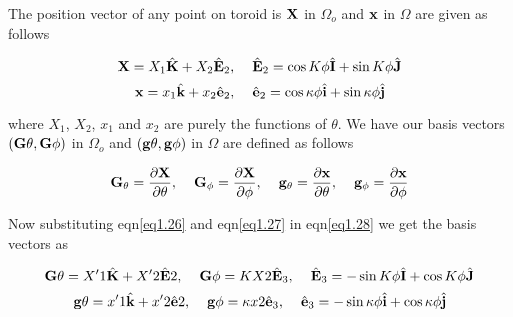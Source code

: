 \documentclass[12pt]{report}
\begin{document}
\begin{flushleft}

The position vector of any point on toroid is ${\bf{X}}$ in $\Omega_{o}$ and ${\bf{x}}$ in $\Omega$ are given as follows

\begin{equation}\label{eq1.26}
    {\bf{X}} = X_{1}\hat{\bf{K}} + X_{2}\hat{\bf{E}}_{2},\hspace{4mm}
    \hat{\bf{E}}_{2} = \cos K\phi\hat{\bf{I}} +\sin K\phi\hat{\bf{J}}
\end{equation}
\vspace{-4mm}
\begin{equation}\label{eq1.27}
    {\bf{x}} = x_{1}\hat{\bf{k}} + x_{2}\hat{\bf{e}}_{2},\hspace{4mm}
    \hat{\bf{e}}_{2} = \cos \kappa\phi\hat{\bf{i}} +\sin \kappa\phi\hat{\bf{j}}
\end{equation}

where $X_{1}$, $X_{2}$, $x_{1}$ and $x_{2}$ are purely the functions of $\theta$. We have our basis vectors $({\bf{G}}{\theta},{\bf{G}}{\phi})$ in $\Omega_{o}$ and $({\bf{g}}{\theta},{\bf{g}}{\phi})$ in $\Omega$ are defined as follows

\begin{equation}\label{eq1.28}
    {\bf{G}}_{\theta} = \frac{\partial {\bf{X}} }{\partial\theta},\hspace{4mm}
    {\bf{G}}_{\phi} = \frac{\partial {\bf{X}} }{\partial\phi},\hspace{4mm}
    {\bf{g}}_{\theta} = \frac{\partial {\bf{x}} }{\partial\theta},\hspace{4mm}
    {\bf{g}}_{\phi} = \frac{\partial {\bf{x}} }{\partial\phi}
\end{equation}

\pagebreak

Now substituting eqn\ref{eq1.26} and eqn\ref{eq1.27} in eqn\ref{eq1.28} we get the basis vectors as

\begin{equation}\label{eq1.29}
    {\bf{G}}{\theta} = X'{1}\hat{\bf{K}} + X'{2}\hat{\bf{E}}{2},\hspace{4mm}
    {\bf{G}}{\phi} = K X{2}\hat{\bf{E}}_{3},\hspace{4mm}
    \hat{\bf{E}}_{3} = -\sin K\phi\hat{\bf{I}} +\cos K\phi\hat{\bf{J}}
\end{equation}
\vspace{-4mm}
\begin{equation}\label{eq1.30}
    {\bf{g}}{\theta} = x'{1}\hat{\bf{k}} + x'{2}\hat{\bf{e}}{2},\hspace{4mm}
    {\bf{g}}{\phi} = \kappa x{2}\hat{\bf{e}}_{3},\hspace{4mm}
    \hat{\bf{e}}_{3} = -\sin \kappa\phi\hat{\bf{i}} +\cos \kappa\phi\hat{\bf{j}}
\end{equation}


\end{flushleft}
\end{document}
